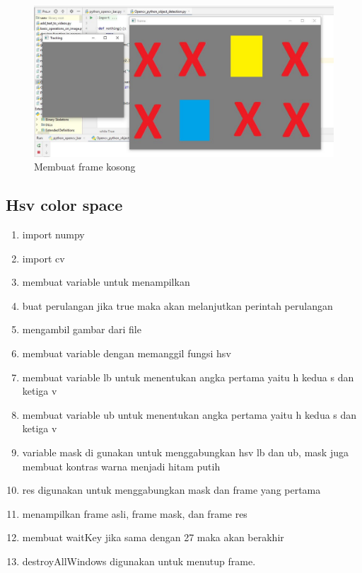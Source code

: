\newpage
\begin{figure}[ht]
\centering
\includegraphics[scale=0.43]{figures/2,34.jpg}
\caption{Membuat frame kosong}
\label{contoh}
\end{figure}



\newpage
\subsection{Hsv color space}

\begin{enumerate}
	\item import numpy
	\item import cv
	\item membuat variable untuk menampilkan
	\item buat perulangan jika true maka akan melanjutkan perintah perulangan
	\item mengambil gambar dari file
	\item membuat variable dengan memanggil fungsi hsv
	\item membuat variable lb untuk menentukan angka pertama yaitu h kedua s dan ketiga v
	\item membuat variable ub untuk menentukan angka pertama yaitu h kedua s dan ketiga v
	\item variable mask di gunakan untuk menggabungkan hsv lb dan ub, mask juga membuat kontras warna menjadi hitam putih
	\item res digunakan untuk menggabungkan mask dan frame yang pertama
	\item menampilkan frame asli, frame mask, dan frame res
	\item membuat waitKey jika sama dengan 27 maka akan berakhir
	\item destroyAllWindows digunakan untuk menutup frame.
\end{enumerate}

